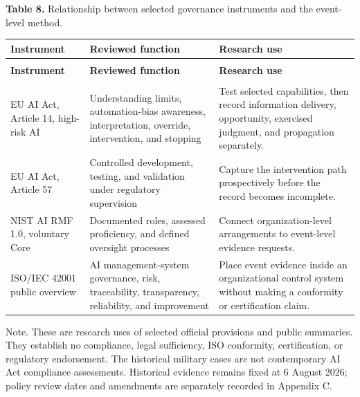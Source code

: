 \documentclass[11pt]{article}
\renewcommand{\arraystretch}{1.10}
\newlength{\TAETableWidth}
\begin{document}
\label{table-8}
{\small \textcolor{TAENavy}{\textbf{Table 8.}} Relationship between selected governance instruments and the event-level method.\par}
\begingroup
\small
\setlength{\tabcolsep}{4pt}
\renewcommand{\arraystretch}{1.12}
\setlength{\TAETableWidth}{\dimexpr\linewidth-4\tabcolsep\relax}
\begin{longtable}{@{}>{\raggedright\arraybackslash}p{0.230\TAETableWidth}>{\raggedright\arraybackslash}p{0.310\TAETableWidth}>{\raggedright\arraybackslash}p{0.460\TAETableWidth}@{}}
\toprule
\rowcolor{TAEPaleNavy}
\textcolor{TAENavy}{\textbf{Instrument}} & \textcolor{TAENavy}{\textbf{Reviewed function}} & \textcolor{TAENavy}{\textbf{Research use}} \\
\midrule
\endfirsthead
\multicolumn{3}{@{}l}{\footnotesize Table 8 (continued)}\\
\toprule
\rowcolor{TAEPaleNavy}
\textcolor{TAENavy}{\textbf{Instrument}} & \textcolor{TAENavy}{\textbf{Reviewed function}} & \textcolor{TAENavy}{\textbf{Research use}} \\
\midrule
\endhead
\midrule
\multicolumn{3}{r@{}}{\footnotesize Continued on next page}\\
\endfoot
\bottomrule
\endlastfoot
EU AI Act, Article 14, high-risk AI & Understanding limits, automation-bias awareness, interpretation, override, intervention, and stopping & Test selected capabilities, then record information delivery, opportunity, exercised judgment, and propagation separately. \\
EU AI Act, Article 57 & Controlled development, testing, and validation under regulatory supervision & Capture the intervention path prospectively before the record becomes incomplete. \\
NIST AI RMF 1.0, voluntary Core & Documented roles, assessed proficiency, and defined oversight processes & Connect organization-level arrangements to event-level evidence requests. \\
ISO/IEC 42001 public overview & AI management-system governance, risk, traceability, transparency, reliability, and improvement & Place event evidence inside an organizational control system without making a conformity or certification claim. \\
\end{longtable}
\endgroup
{\footnotesize\raggedright Note. These are research uses of selected official provisions and public summaries. They establish no compliance, legal sufficiency, ISO conformity, certification, or regulatory endorsement. The historical military cases are not contemporary AI Act compliance assessments. Historical evidence remains fixed at 6 August 2026; policy review dates and amendments are separately recorded in Appendix C.\par}
\medskip
\end{document}
